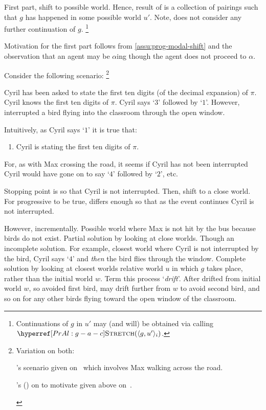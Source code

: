 \begin{note}
  First part, shift to possible world.
  Hence, result of \AlgFindBranches{} is a collection of pairings such that \(g\) has happened in some possible world \(u'\).
  Note, \AlgFindBranches{} does not consider any further continuation of \(g\).%
  \footnote{
    Continuations of \(g\) in \(u'\) may (and will) be obtained via calling \(\AlgAC{(\langle g,u' \rangle_{i})}\).
  }

  Motivation for the first part follows from \autoref{assu:prog-modal-shift} and the observation that an agent may be \(\alpha\)ing though the agent does not proceed to \(\alpha\).

  Consider the following scenario:%
  \footnote{
    Variation on both:
    \begin{enumerate*}[label=(\alph*), ref=(\alph*)]
    \item
      \citeauthor{Landman:1992wh}'s scenario given on~ which involves Max walking across the road.
    \item
      \citeauthor{Schwarz:2020aa}'s (\citeyear{Schwarz:2020aa}) on to motivate \AbControl{} given above on~.
    \end{enumerate*}
  }

  \begin{scenario}[State \(\pi\)]
    \label{scen:prog:Cyril:know}
    Cyril has been asked to state the first ten digits (of the decimal expansion) of \(\pi\).
    Cyril knows the first ten digits of \(\pi\).
    Cyril says `\(3\)' followed by `\(1\)'.
    However, interrupted a bird flying into the classroom through the open window.
  \end{scenario}
  Intuitively, as Cyril says `\(1\)' it is true that:
  \begin{enumerate}
  \item
    \label{Cyril:pi:progressive}
    Cyril is stating the first ten digits of \(\pi\).
  \end{enumerate}
  For, as with Max crossing the road, it seems if Cyril has not been interrupted Cyril would have gone on to say `\(4\)' followed by `\(2\)', etc.

  Stopping point is so that Cyril is not interrupted.
  Then, shift to a close world.
  For progressive to be true, differs enough so that as the event continues Cyril is not interrupted.

  However, incrementally.
  Possible world where Max is not hit by the bus because birds do not exist.
  Partial solution by looking at close worlds.
  Though an incomplete solution.
  For example, closest world where Cyril is not interrupted by the bird, Cyril says `\(4\)' and \emph{then} the bird flies through the window.
  Complete solution by looking at closest worlds relative world \(u\) in which \(g\) takes place, rather than the initial world \(w\).
  Term this process `\emph{drift}'.
  After drifted from initial world \(w\), so avoided first bird, may drift further from \(w\) to avoid second bird, and so on for any other birds flying toward the open window of the classroom.


\end{note}
